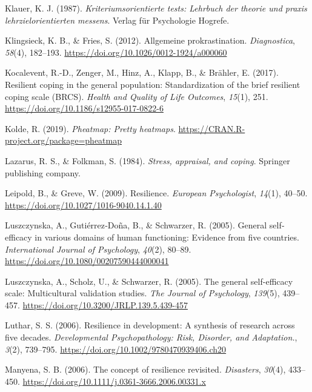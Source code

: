 \documentclass[
  man,floatsintext]{apa7}
\newlength{\cslhangindent}
\newenvironment{CSLReferences}[2] %
 {\begin{list}{}{%
  \setlength{\itemindent}{0pt}
  \setlength{\leftmargin}{0pt}
  \setlength{\parsep}{0pt}
  \ifodd #1
   \setlength{\leftmargin}{\cslhangindent}
   \setlength{\itemindent}{-1\cslhangindent}
  \fi
  \setlength{\itemsep}{#2\baselineskip}}}
 {\end{list}}
\begin{document}
\begin{CSLReferences}{1}{0}
Klauer, K. J. (1987). \emph{Kriteriumsorientierte tests: Lehrbuch der theorie und praxis lehrzielorientierten messens}. Verlag f{ü}r Psychologie Hogrefe.

Klingsieck, K. B., \& Fries, S. (2012). Allgemeine prokrastination. \emph{Diagnostica}, \emph{58}(4), 182--193. \url{https://doi.org/10.1026/0012-1924/a000060}

Kocalevent, R.-D., Zenger, M., Hinz, A., Klapp, B., \& Brähler, E. (2017). Resilient coping in the general population: Standardization of the brief resilient coping scale ({BRCS}). \emph{Health and Quality of Life Outcomes}, \emph{15}(1), 251. \url{https://doi.org/10.1186/s12955-017-0822-6}

Kolde, R. (2019). \emph{Pheatmap: Pretty heatmaps}. \url{https://CRAN.R-project.org/package=pheatmap}

Lazarus, R. S., \& Folkman, S. (1984). \emph{Stress, appraisal, and coping}. Springer publishing company.

Leipold, B., \& Greve, W. (2009). Resilience. \emph{European Psychologist}, \emph{14}(1), 40--50. \url{https://doi.org/10.1027/1016-9040.14.1.40}

Luszczynska, A., Gutiérrez‐Doña, B., \& Schwarzer, R. (2005). General self‐efficacy in various domains of human functioning: Evidence from five countries. \emph{International Journal of Psychology}, \emph{40}(2), 80--89. \url{https://doi.org/10.1080/00207590444000041}

Luszczynska, A., Scholz, U., \& Schwarzer, R. (2005). The general self-efficacy scale: Multicultural validation studies. \emph{The Journal of Psychology}, \emph{139}(5), 439--457. \url{https://doi.org/10.3200/JRLP.139.5.439-457}

Luthar, S. S. (2006). Resilience in development: {A} synthesis of research across five decades. \emph{Developmental Psychopathology: Risk, Disorder, and Adaptation.}, \emph{3}(2), 739--795. \url{https://doi.org/10.1002/9780470939406.ch20}

Manyena, S. B. (2006). The concept of resilience revisited. \emph{Disasters}, \emph{30}(4), 433--450. \url{https://doi.org/10.1111/j.0361-3666.2006.00331.x}


\end{CSLReferences}
\end{document}
